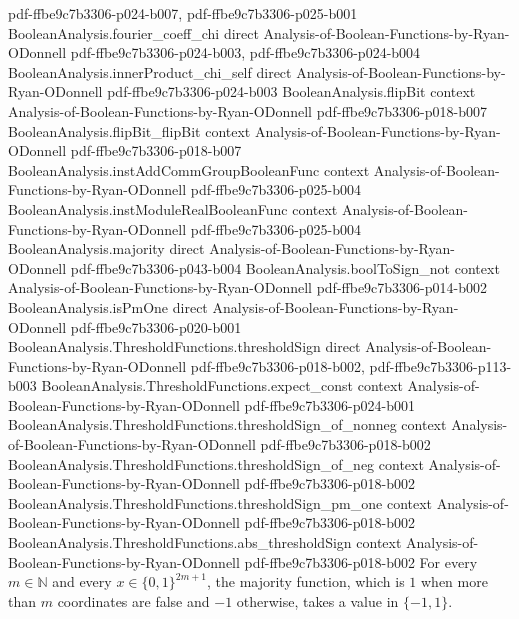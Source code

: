 \begin{lemma}
  {pdf-ffbe9c7b3306-p024-b007,
    pdf-ffbe9c7b3306-p025-b001}
\proofstep
  {BooleanAnalysis.fourier_coeff_chi}
  {direct}
  {Analysis-of-Boolean-Functions-by-Ryan-ODonnell}
  {pdf-ffbe9c7b3306-p024-b003,
    pdf-ffbe9c7b3306-p024-b004}
\proofstep
  {BooleanAnalysis.innerProduct_chi_self}
  {direct}
  {Analysis-of-Boolean-Functions-by-Ryan-ODonnell}
  {pdf-ffbe9c7b3306-p024-b003}
\proofstep
  {BooleanAnalysis.flipBit}
  {context}
  {Analysis-of-Boolean-Functions-by-Ryan-ODonnell}
  {pdf-ffbe9c7b3306-p018-b007}
\proofstep
  {BooleanAnalysis.flipBit_flipBit}
  {context}
  {Analysis-of-Boolean-Functions-by-Ryan-ODonnell}
  {pdf-ffbe9c7b3306-p018-b007}
\proofstep
  {BooleanAnalysis.instAddCommGroupBooleanFunc}
  {context}
  {Analysis-of-Boolean-Functions-by-Ryan-ODonnell}
  {pdf-ffbe9c7b3306-p025-b004}
\proofstep
  {BooleanAnalysis.instModuleRealBooleanFunc}
  {context}
  {Analysis-of-Boolean-Functions-by-Ryan-ODonnell}
  {pdf-ffbe9c7b3306-p025-b004}
\proofstep
  {BooleanAnalysis.majority}
  {direct}
  {Analysis-of-Boolean-Functions-by-Ryan-ODonnell}
  {pdf-ffbe9c7b3306-p043-b004}
\proofstep
  {BooleanAnalysis.boolToSign_not}
  {context}
  {Analysis-of-Boolean-Functions-by-Ryan-ODonnell}
  {pdf-ffbe9c7b3306-p014-b002}
\proofstep
  {BooleanAnalysis.isPmOne}
  {direct}
  {Analysis-of-Boolean-Functions-by-Ryan-ODonnell}
  {pdf-ffbe9c7b3306-p020-b001}
\proofstep
  {BooleanAnalysis.ThresholdFunctions.thresholdSign}
  {direct}
  {Analysis-of-Boolean-Functions-by-Ryan-ODonnell}
  {pdf-ffbe9c7b3306-p018-b002,
    pdf-ffbe9c7b3306-p113-b003}
\proofstep
  {BooleanAnalysis.ThresholdFunctions.expect_const}
  {context}
  {Analysis-of-Boolean-Functions-by-Ryan-ODonnell}
  {pdf-ffbe9c7b3306-p024-b001}
\proofstep
  {BooleanAnalysis.ThresholdFunctions.thresholdSign_of_nonneg}
  {context}
  {Analysis-of-Boolean-Functions-by-Ryan-ODonnell}
  {pdf-ffbe9c7b3306-p018-b002}
\proofstep
  {BooleanAnalysis.ThresholdFunctions.thresholdSign_of_neg}
  {context}
  {Analysis-of-Boolean-Functions-by-Ryan-ODonnell}
  {pdf-ffbe9c7b3306-p018-b002}
\proofstep
  {BooleanAnalysis.ThresholdFunctions.thresholdSign_pm_one}
  {context}
  {Analysis-of-Boolean-Functions-by-Ryan-ODonnell}
  {pdf-ffbe9c7b3306-p018-b002}
\proofstep
  {BooleanAnalysis.ThresholdFunctions.abs_thresholdSign}
  {context}
  {Analysis-of-Boolean-Functions-by-Ryan-ODonnell}
  {pdf-ffbe9c7b3306-p018-b002}
For every $m\in\mathbb N$ and every $x\in\{0,1\}^{2m+1}$, the majority function, which
is $1$ when more than $m$ coordinates are false and $-1$ otherwise, takes a value in
$\{-1,1\}$.
\end{lemma}

